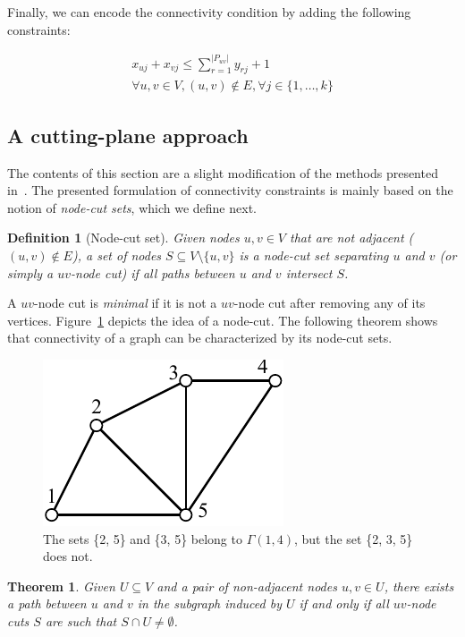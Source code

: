 \documentclass[conference,compsoc]{IEEEtran}
\newtheorem{theorem}{Theorem}
\newtheorem{definition}{Definition}
\begin{document}
Finally, we can encode the connectivity condition by adding the following constraints:

\begin{multline}
x_{uj} + x_{vj} \leq \sum_{r=1}^{|P_{uv}|} y_{rj} + 1 \\
\forall u, v \in V, (u, v) \notin E, \forall j \in \{1, \ldots, k\}
\end{multline}

\subsection{A cutting-plane approach}
 The contents of this
section are a slight modification of the methods presented in~\cite{CarvajalCGVW13}. The presented formulation of connectivity constraints is mainly based on the notion of \emph{node-cut sets}, which we define next. 

\begin{definition}[Node-cut set]
Given nodes $u, v \in V$ that are not adjacent ($(u, v) \notin E$), a set of nodes $S \subseteq V \setminus \{u, v\}$ is a \emph{node-cut set} separating $u$ and $v$ (or simply a \emph{$uv$-node cut}) if all paths between $u$ and $v$ intersect $S$.
\end{definition}

A $uv$-node cut is \emph{minimal} if it is not a $uv$-node cut after removing any of its vertices. Figure~\ref{fig:cutset} depicts the idea of a node-cut. The following theorem shows that connectivity of a graph can be characterized by its node-cut sets. 

\begin{figure}
\centering
\includegraphics[scale=0.7]{images/cutset}
\caption{The sets \{2, 5\} and \{3, 5\} belong to $\Gamma(1, 4)$, but the set \{2, 3, 5\} does not.}
\label{fig:cutset}
\end{figure}

\begin{theorem}
Given $U \subseteq V$ and a pair of non-adjacent nodes $u, v \in U$, there exists a path between $u$ and $v$ in the subgraph induced by $U$ if and only if all $uv$-node cuts $S$ are such that $S \cap U \neq \emptyset$.
\end{theorem}
\end{document}

